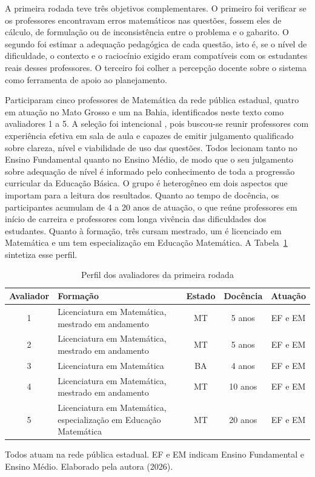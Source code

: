 A primeira rodada teve três objetivos complementares. O primeiro foi verificar se os professores
encontravam erros matemáticos nas questões, fossem eles de cálculo, de formulação ou de
inconsistência entre o problema e o gabarito. O segundo foi estimar a adequação pedagógica de cada
questão, isto é, se o nível de dificuldade, o contexto e o raciocínio exigido eram compatíveis com
os estudantes reais desses professores. O terceiro foi colher a percepção docente sobre o sistema
como ferramenta de apoio ao planejamento.

Participaram cinco professores de Matemática da rede pública estadual, quatro em atuação no Mato
Grosso e um na Bahia, identificados neste texto como avaliadores 1 a 5. A seleção foi intencional
\citep{bogdan1994investigacao}, pois buscou-se reunir professores com experiência efetiva em sala
de aula e capazes de emitir julgamento qualificado sobre clareza, nível e viabilidade de uso das
questões. Todos lecionam tanto no Ensino Fundamental quanto no Ensino Médio, de modo que o seu
julgamento sobre adequação de nível é informado pelo conhecimento de toda a progressão curricular
da Educação Básica. O grupo é heterogêneo em dois aspectos que importam para a leitura dos
resultados. Quanto ao tempo de docência, os participantes acumulam de 4 a 20 anos de atuação, o
que reúne professores em início de carreira e professores com longa vivência das dificuldades dos
estudantes. Quanto à formação, três cursam mestrado, um é licenciado em Matemática e um tem
especialização em Educação Matemática. A Tabela~\ref{quad:perfil-avaliadores} sintetiza esse perfil.

\begin{table}[htbp]
  \centering
  \caption{Perfil dos avaliadores da primeira rodada}
  \label{quad:perfil-avaliadores}
  \small
  \begin{tabular}{c>{\raggedright\arraybackslash}p{5.6cm}ccc}
    \toprule
    Avaliador & Formação & Estado & Docência & Atuação \\
    \midrule
    1 & Licenciatura em Matemática, mestrado em andamento & MT & 5 anos & EF e EM \\
    2 & Licenciatura em Matemática, mestrado em andamento & MT & 5 anos & EF e EM \\
    3 & Licenciatura em Matemática & BA & 4 anos & EF e EM \\
    4 & Licenciatura em Matemática, mestrado em andamento & MT & 10 anos & EF e EM \\
    5 & Licenciatura em Matemática, especialização em Educação Matemática & MT & 20 anos & EF e EM \\
    \bottomrule
  \end{tabular}

  \smallskip
  {\footnotesize Todos atuam na rede pública estadual. EF e EM indicam Ensino Fundamental e Ensino
  Médio. Elaborado pela autora (2026).}
\end{table}

